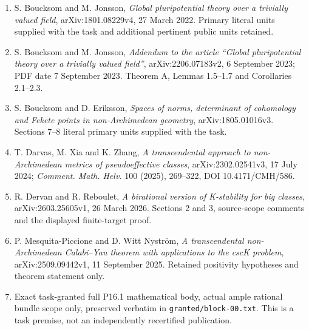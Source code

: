 \documentclass[
  10pt,
]{article}
\providecommand{\tightlist}{%
  \setlength{\itemsep}{0pt}\setlength{\parskip}{0pt}}
\begin{document}
\begin{enumerate}
\def\labelenumi{\arabic{enumi}.}
\tightlist
\item
  S. Boucksom and M. Jonsson, \emph{Global pluripotential theory over a
  trivially valued field}, arXiv:1801.08229v4, 27 March 2022. Primary
  literal units supplied with the task and additional pertinent public
  units retained.
\item
  S. Boucksom and M. Jonsson, \emph{Addendum to the article ``Global
  pluripotential theory over a trivially valued field''},
  arXiv:2206.07183v2, 6 September 2023; PDF date 7 September 2023.
  Theorem A, Lemmas 1.5--1.7 and Corollaries 2.1--2.3.
\item
  S. Boucksom and D. Eriksson, \emph{Spaces of norms, determinant of
  cohomology and Fekete points in non-Archimedean geometry},
  arXiv:1805.01016v3. Sections 7--8 literal primary units supplied with
  the task.
\item
  T. Darvas, M. Xia and K. Zhang, \emph{A transcendental approach to
  non-Archimedean metrics of pseudoeffective classes},
  arXiv:2302.02541v3, 17 July 2024; \emph{Comment. Math. Helv.} 100
  (2025), 269--322, DOI 10.4171/CMH/586.
\item
  R. Dervan and R. Reboulet, \emph{A birational version of K-stability
  for big classes}, arXiv:2603.25605v1, 26 March 2026. Sections 2 and 3,
  source-scope comments and the displayed finite-target proof.
\item
  P. Mesquita-Piccione and D. Witt Nyström, \emph{A transcendental
  non-Archimedean Calabi--Yau theorem with applications to the cscK
  problem}, arXiv:2509.09442v1, 11 September 2025. Retained positivity
  hypotheses and theorem statement only.
\item
  Exact task-granted full P16.1 mathematical body, actual ample rational
  bundle scope only, preserved verbatim in
  \texttt{granted/block-00.txt}. This is a task premise, not an
  independently recertified publication.
\end{enumerate}
\end{document}
